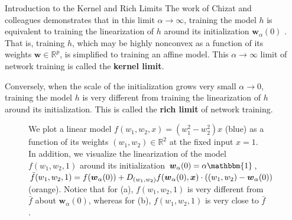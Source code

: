 \documentclass[final, 20pt]{beamer}
\newlength{\sepwidth}
\newlength{\colwidth}
\newcommand{\separatorcolumn}{\begin{column}{\sepwidth}\end{column}}
\begin{document}
\begin{frame}[t]
\begin{columns}[t]
\begin{column}{\colwidth}
\begin{block}{Introduction to the Kernel and Rich Limits}
    The work of Chizat and colleagues demonstrates that in this limit $\alpha \rightarrow \infty$, training the model $h$ is equivalent to training the linearization of $h$ around its initialization $\boldsymbol{w}_{\alpha}(0)$ \cite{chizat2018lazy}. That is, training $h$, which may be highly nonconvex as a function of its weights $\boldsymbol{w} \in \mathbb{R}^p$, is simplified to training an affine model. This $\alpha \rightarrow \infty$ limit of network training is called the \textbf{kernel limit}.
    
    Conversely, when the scale of the initialization grows very small $\alpha \rightarrow 0$, training the model $h$ is very different from training the linearization of $h$ around its initialization. This is called the \textbf{rich limit} of network training.

    \begin{figure}
        \centering
        \hfill
        \hfill
        \caption{We plot a linear model $f(w_1, w_2, x) = (w_1^2 - w_2^2)x$ (blue) as a function of its weights $(w_1, w_2) \in \mathbb{R}^2$ at the fixed input $x = 1$. In addition, we visualize the linearization of the model $f(w_1, w_2, 1)$ around its initialization  $\boldsymbol{w}_{\alpha}(0) = \alpha \mathbbm{1}$, $\bar{f}(w_1, w_2, 1) = f(\boldsymbol{w}_{\alpha}(0)) + D_{(w_1, w_2)} f(\boldsymbol{w}_{\alpha}(0), \boldsymbol{x})\\ 
        \cdot ((w_1, w_2) - \boldsymbol{w}_{\alpha}(0))$ (orange). Notice that for (a),  $f(w_1, w_2, 1)$ is very different from $\bar{f}$ about $\boldsymbol{w}_{\alpha}(0)$, whereas for (b),  $f(w_1, w_2, 1)$ is very close to $\bar{f}$.}
        \label{fig:my_label}
    \end{figure}
  \end{block}
\end{column}
\separatorcolumn


\end{columns}
\end{frame}
\end{document}
